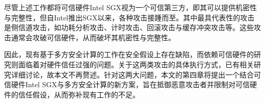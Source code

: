 尽管上述工作都将可信硬件Intel SGX视为一个可信第三方，即其可以提供机密性与完整性，但自Intel推出SGX以来，各种攻击接踵而至。其中最具代表性的攻击是侧信道攻击，如功耗分析攻击、计时攻击、回滚攻击与缓存冲突攻击等\cite{SGX_Exposure, High_Resolution_Side_Channels, Cache_Attack_SGX, CacheZoom, SGX_Cache, mem_side_hazard, PMFaultFA, VoltJockeyAN}。这些攻击通常会攻破可信硬件，从而破坏其机密性与完整性。

因此，现有基于多方安全计算的工作在安全假设上存在缺陷，而依赖可信硬件的研究则面临着对硬件信任过强的问题。关于这两类攻击的具体执行方式，已有相关研究详细讨论\cite{Cryptflow, SGX_Exposure, High_Resolution_Side_Channels, Cache_Attack_SGX}，故本文不再赘述。针对这两大问题，本文的第四章将提出一个结合可信硬件Intel SGX与多方安全计算的新方案，旨在抵御恶意攻击者并限制对可信硬件的信任假设，从而弥补现有工作的不足。

%
%
%



